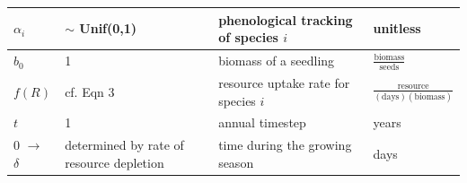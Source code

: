\documentclass[11pt,letter]{article}
\begin{document}
\begin{center}
\begin{table}[h!]
\begin{tabular}{ | p{2.0cm} | p{3.5cm} | p{5.0cm} | p{4.0cm} |}
\(\alpha_{i}\) & $\sim$ Unif(0,1) & phenological tracking of species \(i\) & unitless \\ \hline
\hline
\(b_{0}\) & 1 & biomass of a seedling & \(\frac{\text{biomass}}{\text{seeds}}\) \\ \hline
\(f(R)\) & cf. Eqn 3& resource uptake rate for species \(i\) & \(\frac{\text{resource}}{(\text{days})(\text{biomass})}\)\\ \hline
 \hline
\(t\) & 1 & annual timestep & years \\ \hline
\(0\) $\rightarrow$ \(\delta\) & determined by rate of resource depletion & time during the growing season & days \\ \hline
\hline
\end{tabular}
\label{tab:model}
\end{table}
\end{center}
\clearpage
\end{document}
